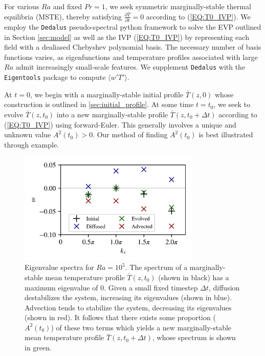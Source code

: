 \documentclass[reprint,amsmath,amssymb,aps]{revtex4-1}
\begin{document}
For various $Ra$ and fixed $Pr = 1$, we seek symmetric marginally-stable thermal equilibria (MSTE), thereby satisfying $\frac{\partial \bar{T}}{\partial t} = 0$ according to (\ref{EQ:T0_IVP}). 
We employ the \texttt{Dedalus} pseudo-spectral python framework to solve the EVP outlined in Section \ref{sec:model} as well as the IVP (\ref{EQ:T0_IVP}) by representing each field with a dealiased Chebyshev polynomial basis. 
The necessary number of basis functions varies, as eigenfunctions and temperature profiles associated with large $Ra$ admit increasingly small-scale features. 
We supplement \texttt{Dedalus} with the \texttt{Eigentools} package to compute $\langle w' T' \rangle$.

At $t = 0$, we begin with a marginally-stable initial profile $\bar{T}(z, 0)$ whose construction is outlined in \ref{sec:initial_profile}. 
At some time $t = t_0$, we seek to evolve $\bar{T}(z, t_0)$ into a new marginally-stable profile $\bar{T}(z, t_0 + \Delta t)$ according to (\ref{EQ:T0_IVP}) using forward-Euler. 
This generally involves a unique and unknown value $A^2(t_0) > 0$. 
Our method of finding $A^2(t_0)$ is best illustrated through example.

\begin{figure}
    \includegraphics[width=3.4in]{EV_spectrum_ol.png}
    \caption{Eigenvalue spectra for $Ra = 10^5$. The spectrum of a marginally-stable mean temperature profile $\bar{T}(z, t_0)$ (shown in black) has a maximum eigenvalue of 0. 
    Given a small fixed timestep $\Delta t$, diffusion destabilizes the system, increasing its eigenvalues (shown in blue). 
    Advection tends to stabilize the system, decreasing its eigenvalues (shown in red). 
    It follows that there exists some proportion ($A^2(t_0)$) of these two terms which yields a new marginally-stable mean temperature profile $\bar{T}(z, t_0 + \Delta t)$, whose spectrum is shown in green.}
    \label{fig:iteration_spectra} 
\end{figure}
\end{document}
